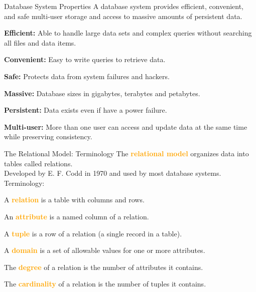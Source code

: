 \documentclass[xcolor=svgnames]{beamer}
\newcommand{\nl}{\\[1em]}
\newcommand{\define}[1]{\textbf{\textcolor{orange}{#1}}}
\theoremstyle{example}
\begin{document}
\begin{frame}{Database System Properties}
A database system provides efficient, convenient, and safe multi-user storage and access to massive amounts of persistent data.\nl
\begin{description}
\item{\bf Efficient:} Able to handle large data sets and complex queries without searching all files and data items.
\item{\bf Convenient:} Easy to write queries to retrieve data.
\item{\bf Safe:} Protects data from system failures and hackers.
\item{\bf Massive:} Database sizes in gigabytes, terabytes and petabytes.
\item{\bf Persistent:} Data exists even if have a power failure.
\item{\bf Multi-user:} More than one user can access and update data at the same time while preserving consistency.
\end{description}
\end{frame}




\begin{frame}{The Relational Model: Terminology}
The \define{relational model} organizes data into tables called relations.\nl
Developed by E. F. Codd in 1970 and used by most database systems.\nl
Terminology:
\begin{description}
\item A \define{relation} is a table with columns and rows.
\item An \define{attribute} is a named column of a relation.
\item A \define{tuple} is a row of a relation (a single record in a table).
\item A \define{domain} is a set of allowable values for one or more attributes.
\item The \define{degree} of a relation is the number of attributes it contains.
\item The \define{cardinality} of a relation is the number of tuples it contains.
\end{description}
\end{frame}
\end{document}
